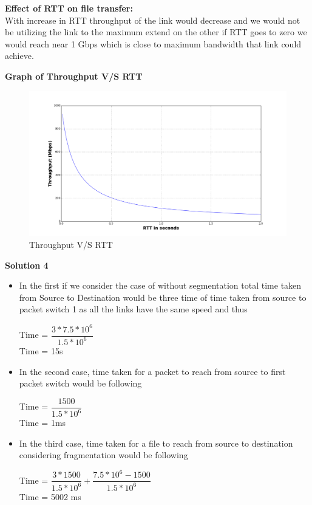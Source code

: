 \documentclass[letterpaper, 11pt]{article}
\begin{document}
\textbf{Effect of RTT on file transfer:} \\
With increase in RTT throughput of the link would decrease and we would not be utilizing the link to the maximum extend on the other if RTT goes to zero we would reach near 1 Gbps which is close to maximum bandwidth that link could achieve.

\textbf{Graph of Throughput V/S RTT}
\begin{figure}[h!]
	\centering
    \includegraphics[width=150mm]{acn_ass_1}
    \caption{Throughput V/S RTT}
\end{figure}
\newline \newline
\bigskip

\textbf{Solution 4}\\
\begin{itemize}
\item In the first if we consider the case of without segmentation total time taken from Source to Destination would be three time of time taken from source to packet switch 1 as all the links have the same speed and thus
\begin{center}
Time = $\dfrac{3*7.5*10^6}{1.5*10^6}$ \\
\leavevmode \newline
Time = 15s
\end{center}
\item In the second case, time taken for a packet to reach from source to first packet switch would be following 
\begin{center}
Time = $\dfrac{1500}{1.5*10^6}$ \\
\leavevmode \newline
Time = 1ms
\end{center}
\item In the third case, time taken for a file to reach from source to destination considering fragmentation would be following
\begin{center}
Time = $\dfrac{3*1500}{1.5*10^6} + \dfrac{7.5*10^6-1500}{1.5*10^6}$ \\
\leavevmode \newline
Time = 5002 ms
\end{center}
\end{itemize}
\bigskip
\end{document}
